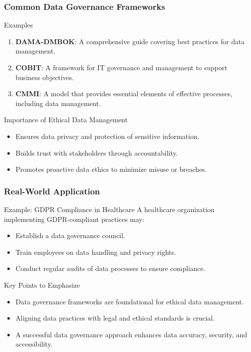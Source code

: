 \documentclass[aspectratio=169]{beamer}
\begin{document}
\begin{frame}[fragile]
    \frametitle{Common Data Governance Frameworks}
    \begin{block}{Examples}
        \begin{enumerate}
            \item \textbf{DAMA-DMBOK}:
            A comprehensive guide covering best practices for data management.
            
            \item \textbf{COBIT}:
            A framework for IT governance and management to support business objectives.
            
            \item \textbf{CMMI}:
            A model that provides essential elements of effective processes, including data management.
        \end{enumerate}
    \end{block}

    \begin{block}{Importance of Ethical Data Management}
        \begin{itemize}
            \item Ensures data privacy and protection of sensitive information.
            \item Builds trust with stakeholders through accountability.
            \item Promotes proactive data ethics to minimize misuse or breaches.
        \end{itemize}
    \end{block}
\end{frame}

\begin{frame}[fragile]
    \frametitle{Real-World Application}
    \begin{block}{Example: GDPR Compliance in Healthcare}
        A healthcare organization implementing GDPR-compliant practices may:
        \begin{itemize}
            \item Establish a data governance council.
            \item Train employees on data handling and privacy rights.
            \item Conduct regular audits of data processes to ensure compliance.
        \end{itemize}
    \end{block}

    \begin{block}{Key Points to Emphasize}
        \begin{itemize}
            \item Data governance frameworks are foundational for ethical data management.
            \item Aligning data practices with legal and ethical standards is crucial.
            \item A successful data governance approach enhances data accuracy, security, and accessibility.
        \end{itemize}
    \end{block}
\end{frame}
\end{document}
